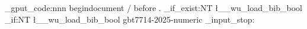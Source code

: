 \RequirePackage { graphicx, hyperref, lipsum, zhlipsum, array }
\graphicspath
  {
    {./fig/}  {./pic/}  {./figure/}  {./picture/}  {./media/}
    {./figs/} {./pics/} {./figures/} {./pictures/}
  }
\hook_gput_code:nnn { begindocument / before } { . }
  {
    \bool_if_exist:NT \l__wu_load_bib_bool
      {
        \bool_if:NT \l__wu_load_bib_bool
          {
            \RequirePackage [ sort,                 capitalizesubtitle,
                              sentencecase = false, spacebeforetypeid ]
                            { gbt7714 }
             { gbt7714-2025-numeric }
          }
      }
  }
\file_input_stop:
